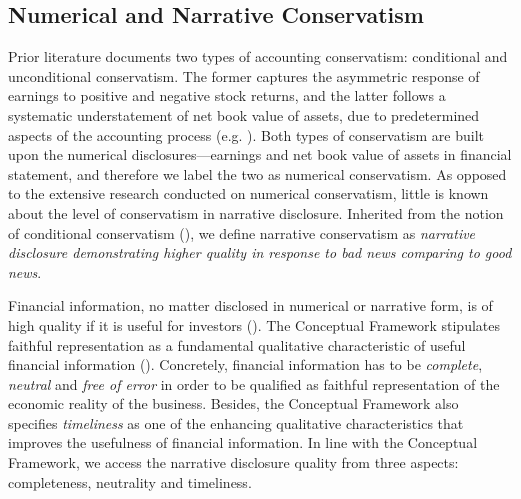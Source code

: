 \documentclass[a4paper]{article}
\begin{document}
\begin{spacing}{2}
\subsection{Numerical and Narrative Conservatism}

Prior literature documents two types of accounting conservatism: conditional and unconditional conservatism. The former captures the asymmetric response of earnings to positive and negative stock returns, and the latter follows a systematic understatement of net book value of assets, due to predetermined aspects of the accounting process (e.g. \cite{beaverConditionalUnconditionalConservatism2005}). Both types of conservatism are built upon the numerical disclosures---earnings and net book value of assets in financial statement, and therefore we label the two as numerical conservatism. As opposed to the extensive research conducted on numerical conservatism, little is known about the level of conservatism in narrative disclosure. Inherited from the notion of conditional conservatism (\cite{basuConservatismPrincipleAsymmetric1997}), we define narrative conservatism as \textit{narrative disclosure demonstrating higher quality in response to bad news comparing to good news}. 

Financial information, no matter disclosed in numerical or narrative form, is of high quality if it is useful for investors (\cite{ballEarningsQualityUK2005}). The Conceptual Framework stipulates faithful representation as a fundamental qualitative characteristic of useful financial information (\cite{fasbConceptualFrameworkFinancial2018}). Concretely, financial information has to be \textit{complete}, \textit{neutral} and \textit{free of error} in order to be qualified as faithful representation of the economic reality of the business. Besides, the Conceptual Framework also specifies \textit{timeliness} as one of the enhancing qualitative characteristics that improves the usefulness of financial information. In line with the Conceptual Framework, we access the narrative disclosure quality from three aspects: completeness, neutrality and timeliness.


\end{spacing}
\end{document}
